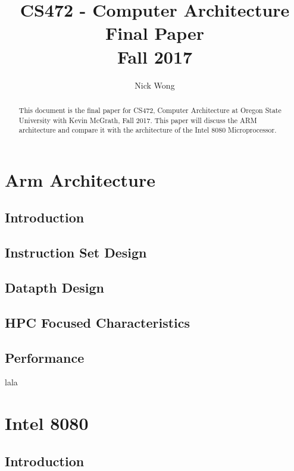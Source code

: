 \documentclass[draftclsnofoot, onecolumn, 10pt, compsoc]{IEEEtran}
\title{\textbf{CS472 - Computer Architecture}\\Final Paper\\Fall 2017}
\author{Nick Wong}
\begin{document}
    \maketitle
    \begin{abstract}
        This document is the final paper for CS472, Computer Architecture at Oregon State University with Kevin McGrath, Fall 2017. This paper will discuss the ARM architecture and compare it with the architecture of the Intel 8080 Microprocessor.
    \end{abstract}
    \newpage
    
    \tableofcontents
    \newpage
    
    \section{Arm Architecture}
        \subsection{Introduction}
            
        \subsection{Instruction Set Design}
            
        \subsection{Datapth Design}
            
        \subsection{HPC Focused Characteristics}
           
        \subsection{Performance}
            lala
        \newpage
        
    \section{Intel 8080}
            
        \subsection{Introduction}
            
\end{document}
